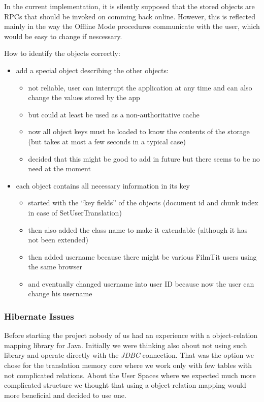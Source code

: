 In the current implementation, it is silently supposed that the stored objects are RPCs that should be invoked on comming back online. However, this is reflected mainly in the way the Offline Mode procedures communicate with the user, which would be easy to change if nescessary.

How to identify the objects correctly:

\begin{itemize}

\item add a special object describing the other objects:

\begin{itemize}
\item not reliable, user can interrupt the application at any time and can also change the values stored by the app
\item but could at least be used as a non-authoritative cache
\item now all object keys must be loaded to know the contents of the storage (but takes at most a few seconds in a typical case)
\item decided that this might be good to add in future but there seems to be no need at the moment
\end{itemize}

\item each object contains all necessary information in its key

\begin{itemize}
\item started with the ``key fields'' of the objects (document id and chunk index in case of SetUserTranslation)
\item then also added the class name to make it extendable (although it has not been extended)
\item then added username because there might be various FilmTit users using the same browser
\item and eventually changed username into user ID because now the user can change his username
\end{itemize}

\end{itemize}

\subsubsection{Hibernate Issues}

Before starting the project nobody of us had an experience with a object-relation mapping library for Java. Initially we were thinking also about not using such library and operate directly with the \emph{JDBC} connection. That was the option we chose for the translation memory core where we work only with few tables with not complicated relations. About the User Spaces where we expected much more complicated structure we thought that using a object-relation mapping would more beneficial and decided to use one. 

